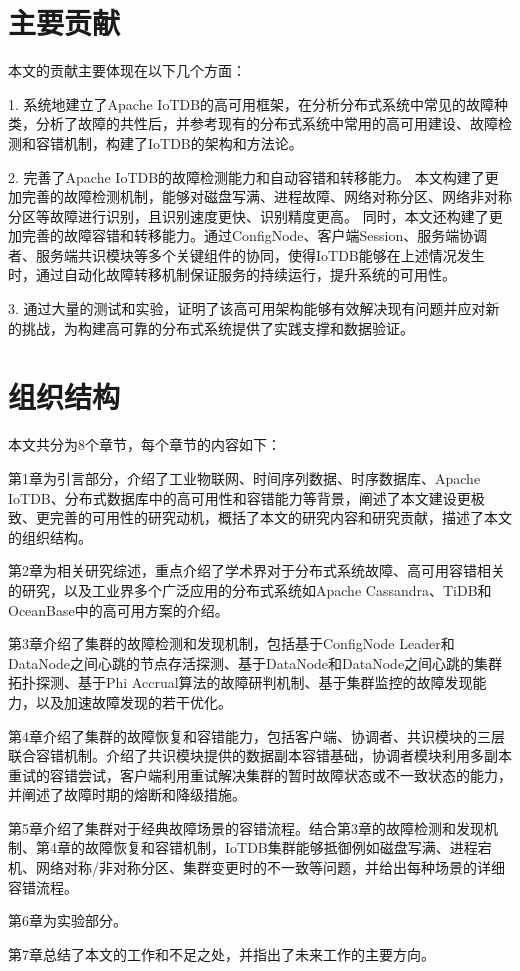 \section{主要贡献}

本文的贡献主要体现在以下几个方面：

1. 系统地建立了Apache IoTDB的高可用框架，在分析分布式系统中常见的故障种类，分析了故障的共性后，并参考现有的分布式系统中常用的高可用建设、故障检测和容错机制，构建了IoTDB的架构和方法论。



2. 完善了Apache IoTDB的故障检测能力和自动容错和转移能力。
本文构建了更加完善的故障检测机制，能够对磁盘写满、进程故障、网络对称分区、网络非对称分区等故障进行识别，且识别速度更快、识别精度更高。
同时，本文还构建了更加完善的故障容错和转移能力。通过ConfigNode、客户端Session、服务端协调者、服务端共识模块等多个关键组件的协同，使得IoTDB能够在上述情况发生时，通过自动化故障转移机制保证服务的持续运行，提升系统的可用性。


3. 通过大量的测试和实验，证明了该高可用架构能够有效解决现有问题并应对新的挑战，为构建高可靠的分布式系统提供了实践支撑和数据验证。


\section{组织结构}
本文共分为8个章节，每个章节的内容如下：

第1章为引言部分，介绍了工业物联网、时间序列数据、时序数据库、Apache IoTDB、分布式数据库中的高可用性和容错能力等背景，阐述了本文建设更极致、更完善的可用性的研究动机，概括了本文的研究内容和研究贡献，描述了本文的组织结构。

第2章为相关研究综述，重点介绍了学术界对于分布式系统故障、高可用容错相关的研究，以及工业界多个广泛应用的分布式系统如Apache Cassandra、TiDB和OceanBase中的高可用方案的介绍。

第3章介绍了集群的故障检测和发现机制，包括基于ConfigNode Leader和DataNode之间心跳的节点存活探测、基于DataNode和DataNode之间心跳的集群拓扑探测、基于Phi Accrual算法的故障研判机制、基于集群监控的故障发现能力，以及加速故障发现的若干优化。

第4章介绍了集群的故障恢复和容错能力，包括客户端、协调者、共识模块的三层联合容错机制。介绍了共识模块提供的数据副本容错基础，协调者模块利用多副本重试的容错尝试，客户端利用重试解决集群的暂时故障状态或不一致状态的能力，并阐述了故障时期的熔断和降级措施。

第5章介绍了集群对于经典故障场景的容错流程。结合第3章的故障检测和发现机制、第4章的故障恢复和容错机制，IoTDB集群能够抵御例如磁盘写满、进程宕机、网络对称/非对称分区、集群变更时的不一致等问题，并给出每种场景的详细容错流程。

第6章为实验部分。

第7章总结了本文的工作和不足之处，并指出了未来工作的主要方向。